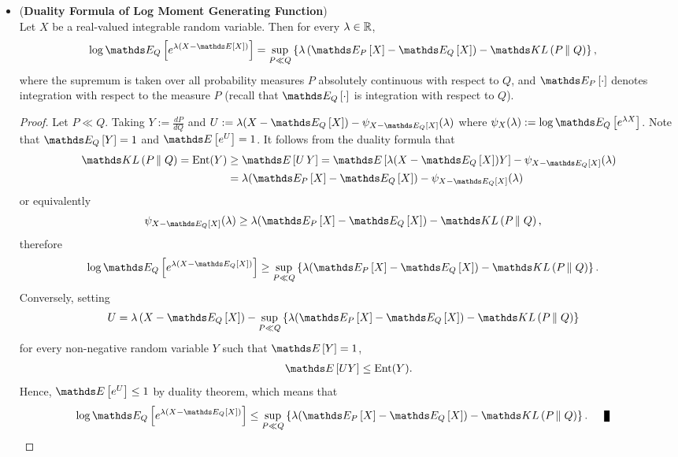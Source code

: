 \documentclass[11pt]{article}
\begin{document}
\begin{itemize}
\item \begin{corollary} \label{coro: dual_log_mgf}  (\textbf{Duality Formula of Log Moment Generating Function}) \citep{thomas2006elements, boucheron2013concentration}\\
Let $X$ be a real-valued integrable random variable. Then for every $\lambda \in {\mathbb R}$, 
\begin{align}
\log \E{Q}{e^{\lambda\paren{X - \E{}{X}}}} &= \sup_{P \ll Q}\set{\lambda\paren{\E{P}{X} - \E{Q}{X}} - \kl{P}{Q} }, \label{eqn: duality_log_mgf}
\end{align} where the supremum is taken over all probability measures $P$ absolutely continuous with respect to $Q$, and $\E{P}{\cdot}$ denotes integration with respect to the measure $P$ (recall that $\E{Q}{\cdot}$ is integration with respect to $Q$).
\end{corollary}
\begin{proof}
Let $P \ll Q$. Taking $Y := \frac{dP}{dQ}$ and $U:= \lambda(X - \E{Q}{X}) - \psi_{X- \E{Q}{X}}(\lambda)$ where $\psi_{X}(\lambda) := \log \E{Q}{e^{\lambda X}}$. Note that $\E{Q}{Y} = 1$ and $\E{}{e^{U}} = 1$. It follows from the duality formula that 
\begin{align*}
\kl{P}{Q} = \text{Ent}(Y) &\ge \E{}{U\,Y} = \E{}{\lambda(X - \E{Q}{X})Y} - \psi_{X- \E{Q}{X}}(\lambda)\\
&= \lambda(\E{P}{X} - \E{Q}{X})  - \psi_{X- \E{Q}{X}}(\lambda)
\end{align*} or equivalently
\begin{align*}
\psi_{X- \E{Q}{X}}(\lambda) &\ge \lambda(\E{P}{X} - \E{Q}{X})  - \kl{P}{Q},
\end{align*} therefore
\begin{align*}
\log\E{Q}{e^{\lambda(X- \E{Q}{X})}} &\ge \sup_{P \ll Q}\set{\lambda(\E{P}{X} - \E{Q}{X})  - \kl{P}{Q}}.
\end{align*} Conversely, setting
\begin{align*}
U &= \lambda\paren{X - \E{Q}{X}} - \sup_{P \ll Q}\set{\lambda(\E{P}{X} - \E{Q}{X})  - \kl{P}{Q}}
\end{align*} for every non-negative random variable $Y$ such that $\E{}{Y} = 1$,
\begin{align*}
\E{}{UY} \le \text{Ent}(Y).
\end{align*} Hence, $\E{}{e^{U}} \le 1$ by duality theorem, which means that 
\begin{align*}
\log \E{Q}{e^{\lambda\paren{X - \E{Q}{X}}}} &\le \sup_{P \ll Q}\set{\lambda(\E{P}{X} - \E{Q}{X})  - \kl{P}{Q}}. \qed
\end{align*}
\end{proof}


\end{itemize}
\end{document}
